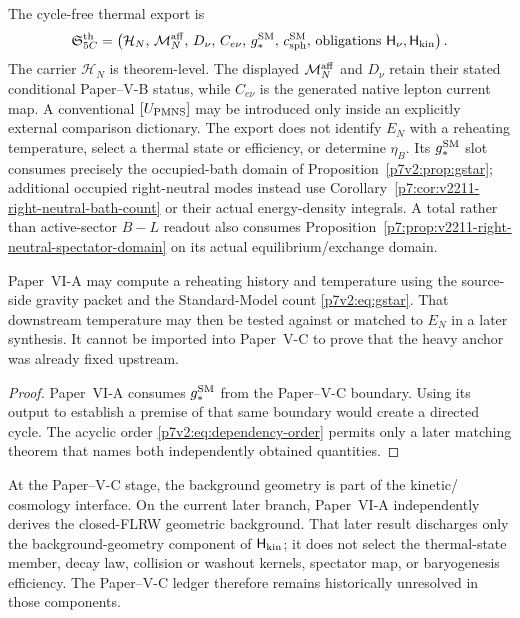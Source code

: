 \documentclass[12pt,a4paper]{article}
\newcommand{\Hkin}{\mathsf{H}_{\rm kin}}
\newcommand{\Hnu}{\mathsf{H}_{\nu}}
\begin{document}
\begin{definition}
\label{p7v2:def:thermal-export}
The cycle-free thermal export is
\begin{equation}
\label{p7v2:eq:thermal-export}
 \mathfrak S_{5C}^{\rm th}
 =
 \left(
  \mathcal H_N,\,
  \mathcal M_N^{\rm aff},\,
  D_\nu,\,
  C_{e\nu},\,
  g_*^{\rm SM},\,
  c_{\rm sph}^{\rm SM},\,
  \text{obligations }\Hnu,\Hkin
 \right).
\end{equation}
The carrier \(\mathcal H_N\) is theorem-level.  The displayed
\(\mathcal M_N^{\rm aff}\) and \(D_\nu\) retain their stated conditional Paper--V-B status,
while \(C_{e\nu}\) is the generated native lepton current map.  A conventional
\([U_{\rm PMNS}]\) may be introduced only inside an explicitly external comparison
dictionary.  The export does not identify \(E_N\) with a reheating temperature,
select a thermal state or efficiency, or determine \(\eta_B\).
Its \(g_*^{\rm SM}\) slot consumes precisely the occupied-bath domain of
Proposition~\ref{p7v2:prop:gstar}; additional occupied right-neutral modes
instead use Corollary~\ref{p7:cor:v2211-right-neutral-bath-count} or their
actual energy-density integrals.  A total rather than active-sector
\(B-L\) readout also consumes
Proposition~\ref{p7:prop:v2211-right-neutral-spectator-domain} on its
actual equilibrium/exchange domain.
\end{definition}

\begin{proposition}
\label{p7v2:prop:no-reheating-backflow}
Paper~VI-A may compute a reheating history and temperature using the
source-side gravity packet and the Standard-Model count
\eqref{p7v2:eq:gstar}.  That downstream temperature may then be tested against
or matched to \(E_N\) in a later synthesis.  It cannot be imported into
Paper~V-C to prove that the heavy anchor was already fixed upstream.
\end{proposition}

\begin{proof}
Paper~VI-A consumes \(g_*^{\rm SM}\) from the Paper--V-C boundary.  Using its
output to establish a premise of that same boundary would create a directed
cycle.  The acyclic order \eqref{p7v2:eq:dependency-order} permits only a later
matching theorem that names both independently obtained quantities.
\end{proof}

\begin{remark}
At the Paper--V-C stage, the background geometry is part of the kinetic/
cosmology interface.  On the current later branch, Paper~VI-A independently
derives the closed-FLRW geometric background.  That later result discharges
only the background-geometry component of \(\Hkin\); it does not select the
thermal-state member, decay law, collision or washout kernels, spectator map,
or baryogenesis efficiency.  The Paper--V-C ledger therefore remains
historically unresolved in those components.
\end{remark}
\end{document}
